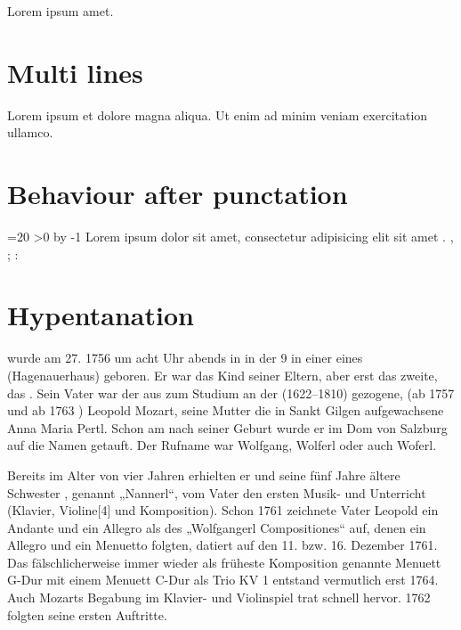 \documentclass{article}
\begin{document}
Lorem ipsum  amet.

\section{Multi lines}

Lorem ipsum  et dolore magna aliqua. Ut enim ad
minim veniam exercitation ullamco.

\section{Behaviour after punctation}

\def\clozepunctation{%
  Lorem ipsum dolor sit amet, consectetur adipisicing elit sit amet
  \cloze{Lorem}.
  \cloze{ipsum},
  \cloze{dolor};
  \cloze{sit}: %
}

\def\Repeat[#1]#2{
  \count0=#1
  \loop
  \ifnum\count0>0
  \advance{} by -1
  #2%
  \repeat
}
\Repeat[20]\clozepunctation %

\section{Hypentanation}

 wurde am 27.  1756 um acht
Uhr abends in  in der  9 in einer
 eines 
(Hagenauerhaus) geboren. Er war das  Kind seiner Eltern,
aber erst das zweite, das . Sein Vater war der aus
 zum Studium an der 
(1622–1810)  gezogene,  (ab 1757  und ab 1763
) Leopold Mozart, seine Mutter die in Sankt
Gilgen aufgewachsene Anna Maria Pertl. Schon am  nach
seiner Geburt wurde er im Dom von Salzburg auf die Namen  getauft. Der Rufname war Wolfgang,
Wolferl oder auch Woferl.

Bereits im Alter von vier Jahren erhielten er und seine fünf Jahre
ältere Schwester , genannt „Nannerl“, vom
Vater den ersten Musik- und  Unterricht (Klavier,
Violine[4] und Komposition). Schon 1761 zeichnete Vater Leopold ein
Andante und ein Allegro als des „Wolfgangerl Compositiones“ auf, denen
ein Allegro und ein Menuetto folgten, datiert auf den 11. bzw. 16.
Dezember 1761. Das fälschlicherweise immer wieder als früheste
Komposition genannte Menuett G-Dur mit einem Menuett C-Dur als Trio KV 1
entstand vermutlich erst 1764. Auch Mozarts Begabung im Klavier- und
Violinspiel trat schnell hervor. 1762 folgten seine ersten Auftritte.
\end{document}
